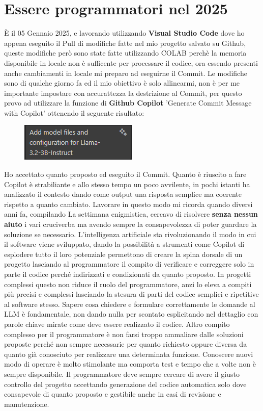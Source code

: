 \documentclass[12pt,a4paper,openright,twoside]{book}
\begin{document}
\section{Essere programmatori nel 2025}
È il 05 Gennaio 2025, e lavorando utilizzando \textbf{Visual Studio Code} dove ho appena eseguito il Pull di modifiche fatte nel mio progetto salvato su Github, queste modifiche però sono state fatte utilizzando COLAB perchè la memoria disponibile in locale non è sufficente per processare il codice, ora essendo presenti anche cambiamenti in locale mi preparo ad eseguirne il Commit.
Le modifiche sono di qualche giorno fa ed il mio obiettivo è solo allinearmi, non è  per me importante impostare con accurattezza la destrizione al Commit, per questo provo ad utilizzare la funzione di \textbf{Github Copilot} 'Generate Commit Message with Copilot' ottenendo il seguente risultato:
\begin{figure}[h]
    \centering
    \includegraphics[width=0.5\linewidth]{figures/commit.png}
    \label{fig:enter-label}
\end{figure}
\newline
Ho accettato quanto proposto ed eseguito il Commit.
Quanto è riuscito a fare Copilot è strabiliante e allo stesso tempo un poco avvilente, in pochi istanti ha analizzato il contesto dando come output una risposta semplice ma coerente rispetto a quanto cambiato.
Lavorare in questo modo mi ricorda quando diversi anni fa, compilando La settimana enigmistica, cercavo di risolvere \textbf{senza nessun aiuto} i vari cruciverba ma avendo sempre la consapevolezza di poter guardare la soluzione se necessario.
\newline
L'intelligenza artificiale sta rivoluzionando il modo in cui il software viene sviluppato, dando la possibilità a strumenti come Copilot di esplodere tutto il loro potenziale permettono di creare la spina dorsale di un progetto lasciando al programmatore il compito di verificare e correggere solo in parte il codice perché indirizzati e condizionati da quanto proposto. 
In progetti complessi questo non riduce il ruolo del programmatore, anzi lo eleva a compiti più precisi e complessi lasciando la stesura di parti del codice semplici e ripetitive al software stesso.
Sapere cosa chiedere e formulare correttamente le domande al LLM è fondamentale, non dando nulla per scontato esplicitando nel dettaglio con parole chiave mirate come deve essere realizzato il codice.
Altro compito complesso per il programmatore è non farsi troppo ammaliare dalle soluzioni proposte perché non sempre necessarie per quanto richiesto oppure diversa da quanto già conosciuto per realizzare una determinata funzione.
Conoscere nuovi modo di operare è molto stimolante ma comporta test e tempo che a volte non è sempre disponibile.
Il programmatore deve sempre cercare di avere il giusto controllo del progetto accettando generazione del codice automatica solo dove consapevole di quanto proposto e gestibile anche in casi di revisione e manutenzione.
\end{document}
